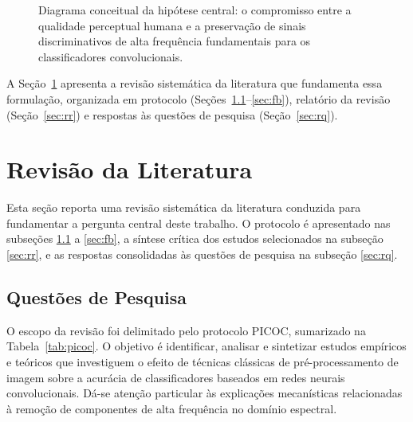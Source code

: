 \documentclass[conference]{IEEEtran}
\begin{document}
\begin{figure}[htbp]
\centering
\resizebox{\columnwidth}{!}{%
%
}
\caption{Diagrama conceitual da hipótese central: o compromisso entre a qualidade perceptual humana e a preservação de sinais discriminativos de alta frequência fundamentais para os classificadores convolucionais.}
\label{fig:hipotese_conceitual}
\end{figure}

A Seção~\ref{sec:revisao} apresenta a revisão sistemática da literatura que
fundamenta essa formulação, organizada em protocolo
(Seções~\ref{sec:qp}--\ref{sec:fb}), relatório da revisão
(Seção~\ref{sec:rr}) e respostas às questões de pesquisa
(Seção~\ref{sec:rq}).

\section{Revisão da Literatura}
\label{sec:revisao}

Esta seção reporta uma revisão sistemática da literatura conduzida para
fundamentar a pergunta central deste trabalho. O protocolo é apresentado nas
subseções \ref{sec:qp} a \ref{sec:fb}, a síntese crítica dos estudos
selecionados na subseção \ref{sec:rr}, e as respostas consolidadas às questões
de pesquisa na subseção \ref{sec:rq}.

\subsection{Questões de Pesquisa}
\label{sec:qp}

O escopo da revisão foi delimitado pelo protocolo PICOC, sumarizado na
Tabela~\ref{tab:picoc}. O objetivo é identificar, analisar e sintetizar
estudos empíricos e teóricos que investiguem o efeito de técnicas clássicas de
pré-processamento de imagem sobre a acurácia de classificadores baseados em
redes neurais convolucionais. Dá-se atenção particular às explicações
mecanísticas relacionadas à remoção de componentes de alta frequência no
domínio espectral.
\end{document}
